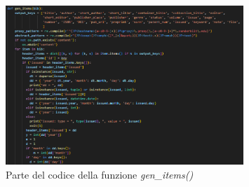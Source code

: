 \documentclass[target=bach,aauheader=]{thud}
\begin{document}
\begin{figure}
    \centering
    \includegraphics[width = 0.8\textwidth]{images/gen-items-1.png}
    \caption{Parte del codice della funzione \textit{gen\_items()}}
    \label{img:genitems1}
\end{figure}
\end{document}
